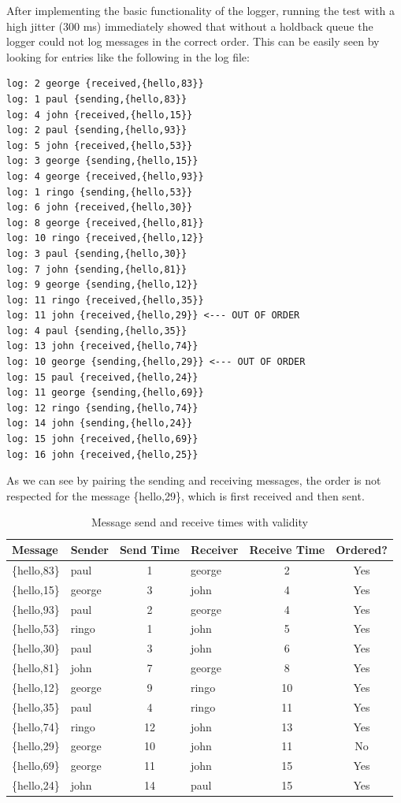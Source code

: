 \documentclass[a4paper, 11pt]{article}
\begin{document}
After implementing the basic functionality of the logger, running the test with a high jitter (300 ms) immediately showed that without a holdback queue the logger could not log messages in the correct order. This can be easily seen by looking for entries like the following in the log file:
\begin{tcolorbox}[colback=black!5!white, colframe=black!80!white, title=Log Output, fonttitle=\bfseries, sharp corners=south, listing only]
\begin{verbatim}
log: 2 george {received,{hello,83}}
log: 1 paul {sending,{hello,83}}
log: 4 john {received,{hello,15}}
log: 2 paul {sending,{hello,93}}
log: 5 john {received,{hello,53}}
log: 3 george {sending,{hello,15}}
log: 4 george {received,{hello,93}}
log: 1 ringo {sending,{hello,53}}
log: 6 john {received,{hello,30}}
log: 8 george {received,{hello,81}}
log: 10 ringo {received,{hello,12}}
log: 3 paul {sending,{hello,30}}
log: 7 john {sending,{hello,81}}
log: 9 george {sending,{hello,12}}
log: 11 ringo {received,{hello,35}}
log: 11 john {received,{hello,29}} <--- OUT OF ORDER
log: 4 paul {sending,{hello,35}}
log: 13 john {received,{hello,74}}
log: 10 george {sending,{hello,29}} <--- OUT OF ORDER
log: 15 paul {received,{hello,24}}
log: 11 george {sending,{hello,69}}
log: 12 ringo {sending,{hello,74}}
log: 14 john {sending,{hello,24}}
log: 15 john {received,{hello,69}}
log: 16 john {received,{hello,25}}
\end{verbatim}
\end{tcolorbox}

As we can see by pairing the sending and receiving messages, the order is not respected for the message \{hello,29\}, which is first received and then sent.

\begin{table}[H]
\centering
\begin{tabular}{|l|l|c|l|c|c|}
\hline
\textbf{Message} & \textbf{Sender} & \textbf{Send Time} & \textbf{Receiver} & \textbf{Receive Time} & \textbf{Ordered?} \\
\hline
\{hello,83\}  & paul   & 1  & george & 2  & Yes \\
\{hello,15\}  & george & 3  & john   & 4  & Yes \\
\{hello,93\}  & paul   & 2  & george & 4  & Yes \\
\{hello,53\}  & ringo  & 1  & john   & 5  & Yes \\
\{hello,30\}  & paul   & 3  & john   & 6  & Yes \\
\{hello,81\}  & john   & 7  & george & 8  & Yes \\
\{hello,12\}  & george & 9  & ringo  & 10 & Yes \\
\{hello,35\}  & paul   & 4  & ringo  & 11 & Yes \\
\{hello,74\}  & ringo  & 12 & john   & 13 & Yes \\
\{hello,29\}  & george & 10 & john   & 11 & No  \\
\{hello,69\}  & george & 11 & john   & 15 & Yes \\
\{hello,24\}  & john   & 14 & paul   & 15 & Yes \\
\hline
\end{tabular}
\caption{Message send and receive times with validity}
\end{table}
\end{document}
